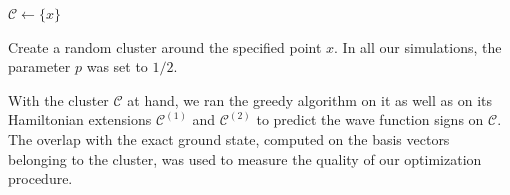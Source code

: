\begin{algorithm}[H]\label{alg:random-cluster}
    \small
    \DontPrintSemicolon
        $\mathcal{C} \longleftarrow \{ x \}$\;
    \vspace{10pt}
\caption{Create a random cluster around the specified point $x$. In all our simulations, the parameter $p$ was set to $1/2$.}
\end{algorithm}

With the cluster $\mathcal{C}$ at hand, we ran the greedy algorithm on it as well as on its Hamiltonian extensions $\mathcal{C}^{(1)}$ and $\mathcal{C}^{(2)}$ to predict the wave function signs on $\mathcal{C}$. The overlap with the exact ground state, computed on the basis vectors belonging to the cluster, was used to measure the quality of our optimization procedure.


